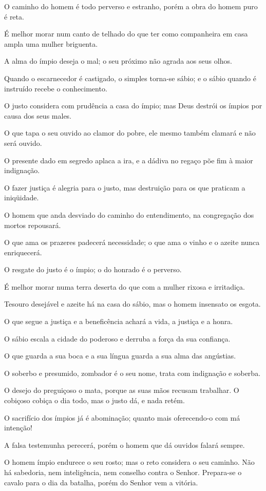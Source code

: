 O caminho do homem é todo perverso e estranho, porém a obra do
homem puro é reta.

É melhor morar num canto de telhado do que ter como companheira em
casa ampla uma mulher briguenta.

A alma do ímpio deseja o mal; o seu próximo não agrada aos seus
olhos.

Quando o escarnecedor é castigado, o simples torna-se sábio; e o
sábio quando é instruído recebe o conhecimento.

O justo considera com prudência a casa do ímpio; mas Deus destrói
os ímpios por causa dos seus males.

O que tapa o seu ouvido ao clamor do pobre, ele mesmo também
clamará e não será ouvido.

O presente dado em segredo aplaca a ira, e a dádiva no regaço põe
fim à maior indignação.

O fazer justiça é alegria para o justo, mas destruição para os
que praticam a iniqüidade.

O homem que anda desviado do caminho do entendimento, na
congregação dos mortos repousará.

O que ama os prazeres padecerá necessidade; o que ama o vinho e o
azeite nunca enriquecerá.

O resgate do justo é o ímpio; o do honrado é o perverso.

É melhor morar numa terra deserta do que com a mulher rixosa e
irritadiça.

Tesouro desejável e azeite há na casa do sábio, mas o homem
insensato os esgota.

O que segue a justiça e a beneficência achará a vida, a justiça e
a honra.

O sábio escala a cidade do poderoso e derruba a força da sua
confiança.

O que guarda a sua boca e a sua língua guarda a sua alma das
angústias.

O soberbo e presumido, zombador é o seu nome, trata com
indignação e soberba.

O desejo do preguiçoso o mata, porque as suas mãos recusam
trabalhar. O cobiçoso cobiça o dia todo, mas o justo dá, e
nada retém.

O sacrifício dos ímpios já é abominação; quanto mais oferecendo-o
com má intenção!

A falsa testemunha perecerá, porém o homem que dá ouvidos falará
sempre.

O homem ímpio endurece o seu rosto; mas o reto considera o seu
caminho. Não há sabedoria, nem inteligência, nem conselho
contra o Senhor. Prepara-se o cavalo para o dia da batalha,
porém do Senhor vem a vitória.

